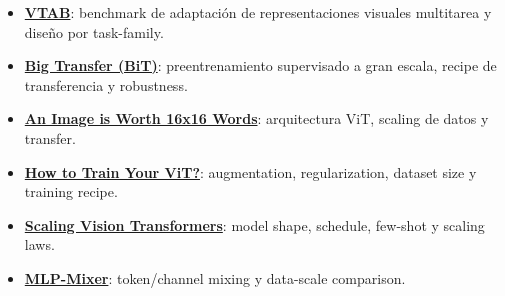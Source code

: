 \documentclass[a4paper]{article}
\begin{document}
{\small
\begin{itemize}[nosep,leftmargin=*]
  \item \href{https://arxiv.org/abs/1910.04867}{\textbf{VTAB}}: benchmark de adaptación de representaciones visuales multitarea y diseño por task-family.
  \item \href{https://arxiv.org/abs/1912.11370}{\textbf{Big Transfer (BiT)}}: preentrenamiento supervisado a gran escala, recipe de transferencia y robustness.
  \item \href{https://arxiv.org/abs/2010.11929}{\textbf{An Image is Worth 16x16 Words}}: arquitectura ViT, scaling de datos y transfer.
  \item \href{https://arxiv.org/abs/2106.10270}{\textbf{How to Train Your ViT?}}: augmentation, regularization, dataset size y training recipe.
  \item \href{https://arxiv.org/abs/2106.04560}{\textbf{Scaling Vision Transformers}}: model shape, schedule, few-shot y scaling laws.
  \item \href{https://arxiv.org/abs/2105.01601}{\textbf{MLP-Mixer}}: token/channel mixing y data-scale comparison.
\end{itemize}
}
\end{document}
